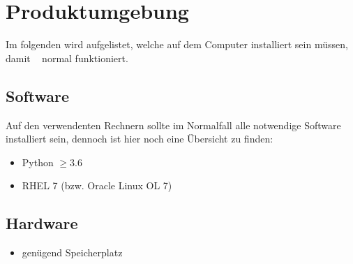 \chapter{Produktumgebung}
Im folgenden wird aufgelistet, welche  auf dem Computer installiert sein müssen, damit \e~ normal funktioniert.\\

\section{Software}
Auf den verwendenten Rechnern sollte im Normalfall alle notwendige Software installiert sein, dennoch ist hier noch eine Übersicht zu finden:

\begin{itemize}
	\item Python $ \geq 3.6$
	\item RHEL 7 (bzw. Oracle Linux OL 7)
\end{itemize}

\section{Hardware}
\begin{itemize}
	\item genügend Speicherplatz
\end{itemize}
